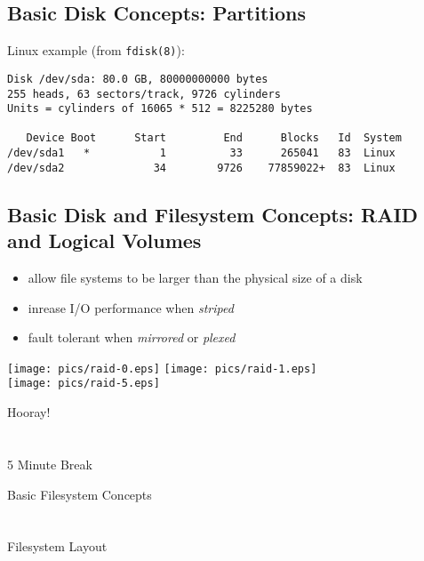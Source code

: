 \documentclass[xga]{xdvislides}
\begin{document}
\subsection{Basic Disk Concepts: Partitions}
Linux example (from {\tt fdisk(8)}):
\begin{verbatim}
Disk /dev/sda: 80.0 GB, 80000000000 bytes
255 heads, 63 sectors/track, 9726 cylinders
Units = cylinders of 16065 * 512 = 8225280 bytes

   Device Boot      Start         End      Blocks   Id  System
/dev/sda1   *           1          33      265041   83  Linux
/dev/sda2              34        9726    77859022+  83  Linux
\end{verbatim}

\subsection{Basic Disk and Filesystem Concepts: RAID and Logical Volumes}
\begin{itemize}
	\item allow file systems to be larger than the physical size of a disk
	\item inrease I/O performance when {\em striped}
	\item fault tolerant when {\em mirrored} or {\em plexed}
\end{itemize}
\vfill
\begin{center}
        \texttt{[image: pics/raid-0.eps]}
        \hspace{.5in}
        \texttt{[image: pics/raid-1.eps]} \\
        \vspace{.2in}
        \texttt{[image: pics/raid-5.eps]}
\end{center}
\vfill


\newpage
\vspace*{\fill}
\begin{center}
    \Hugesize
        Hooray! \\ [1em]
    \hspace*{5mm}
    \blueline\\
    \hspace*{5mm}\\
        5 Minute Break
\end{center}
\vspace*{\fill}

\newpage
\vspace*{\fill}
\begin{center}
	\Hugesize
		Basic Filesystem Concepts\\ [1em]
	\hspace*{5mm}
	\blueline\\
	\hspace*{5mm}\\
		Filesystem Layout
\end{center}
\vspace*{\fill}
\end{document}
